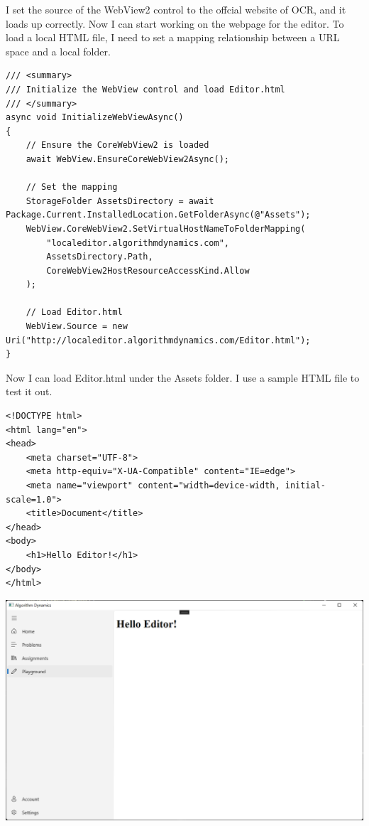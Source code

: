 \documentclass[a4paper]{report}
\begin{document}
I set the source of the WebView2 control to the offcial website of OCR, and it loads up correctly. Now I can start working on the webpage for the editor. To load a local HTML file, I need to set a mapping relationship between a URL space and a local folder.

\begin{verbatim}
/// <summary>
/// Initialize the WebView control and load Editor.html
/// </summary>
async void InitializeWebViewAsync()
{
    // Ensure the CoreWebView2 is loaded
    await WebView.EnsureCoreWebView2Async();

    // Set the mapping
    StorageFolder AssetsDirectory = await Package.Current.InstalledLocation.GetFolderAsync(@"Assets");
    WebView.CoreWebView2.SetVirtualHostNameToFolderMapping(
        "localeditor.algorithmdynamics.com",
        AssetsDirectory.Path,
        CoreWebView2HostResourceAccessKind.Allow
    );

    // Load Editor.html
    WebView.Source = new Uri("http://localeditor.algorithmdynamics.com/Editor.html");
}
\end{verbatim}

Now I can load Editor.html under the Assets folder. I use a sample HTML file to test it out.

\begin{verbatim}
<!DOCTYPE html>
<html lang="en">
<head>
    <meta charset="UTF-8">
    <meta http-equiv="X-UA-Compatible" content="IE=edge">
    <meta name="viewport" content="width=device-width, initial-scale=1.0">
    <title>Document</title>
</head>
<body>
    <h1>Hello Editor!</h1>
</body>
</html>
\end{verbatim}

\includegraphics[width=\textwidth, height=\textheight, keepaspectratio]{PlaygroundPage-WebView2-HelloEditor}
\end{document}
